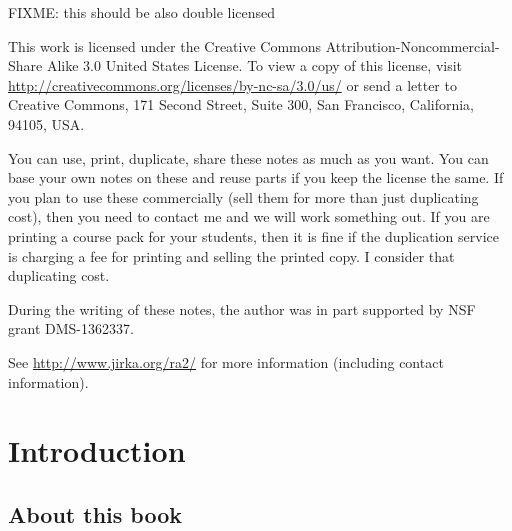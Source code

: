 \documentclass[12pt]{book}
\theoremstyle{plain}
\theoremstyle{remark}
\theoremstyle{definition}
\theoremstyle{exercise}
\theoremstyle{example}
\begin{document}
\bigskip

FIXME: this should be also double licensed

\noindent
This work is licensed under the Creative Commons
Attribution-Non\-commercial-Share Alike 3.0 United States License. To view a
copy of this license, visit
\url{http://creativecommons.org/licenses/by-nc-sa/3.0/us/} or send a letter to
Creative Commons, 171 Second Street, Suite 300, San Francisco, California,
94105, USA.

\bigskip

\noindent
You can use, print, duplicate, share these notes as much as you want.  You can
base your own notes on these and reuse parts if you keep the license the
same.  If you plan to use these commercially (sell them for more than just
duplicating cost), then you need to contact me and we will work something out.
If you are printing a course pack for your students, then it is fine if the 
duplication service is charging a fee for printing and selling the printed
copy.  I consider that duplicating cost.

\bigskip

\noindent
During the writing of these notes, 
the author was in part supported by NSF grant DMS-1362337.

\bigskip

\noindent
See \url{http://www.jirka.org/ra2/} for more information
(including contact information).



\tableofcontents
{}

\newpage


\chapter*{Introduction}


\section*{About this book}
\end{document}
